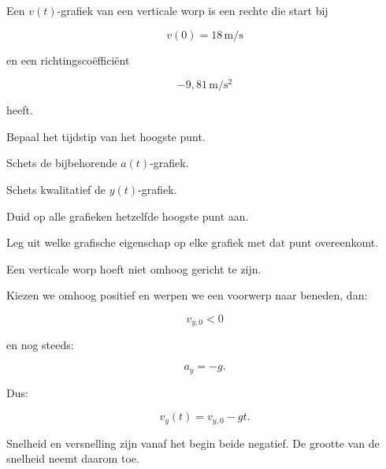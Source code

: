 \documentclass{ximera}
\begin{document}
\begin{oefening}{\oefU\ESS}

Een $v(t)$-grafiek van een verticale worp is een rechte die start bij

\[
v(0)=18\,\mathrm{m/s}
\]

en een richtingscoëfficiënt

\[
-9,81\,\mathrm{m/s^2}
\]

heeft.

\begin{question}
Bepaal het tijdstip van het hoogste punt.
\end{question}

\begin{question}
Schets de bijbehorende $a(t)$-grafiek.
\end{question}

\begin{question}
Schets kwalitatief de $y(t)$-grafiek.
\end{question}

\begin{question}
Duid op alle grafieken hetzelfde hoogste punt aan.
\end{question}

\begin{question}
Leg uit welke grafische eigenschap op elke grafiek met dat punt
overeenkomt.
\end{question}

\end{oefening}




Een verticale worp hoeft niet omhoog gericht te zijn.

Kiezen we omhoog positief en werpen we een voorwerp naar beneden, dan:

\[
v_{y,0}<0
\]

en nog steeds:

\[
a_y=-g.
\]

Dus:

\[
v_y(t)=v_{y,0}-gt.
\]

Snelheid en versnelling zijn vanaf het begin beide negatief. De grootte
van de snelheid neemt daarom toe.
\end{document}
